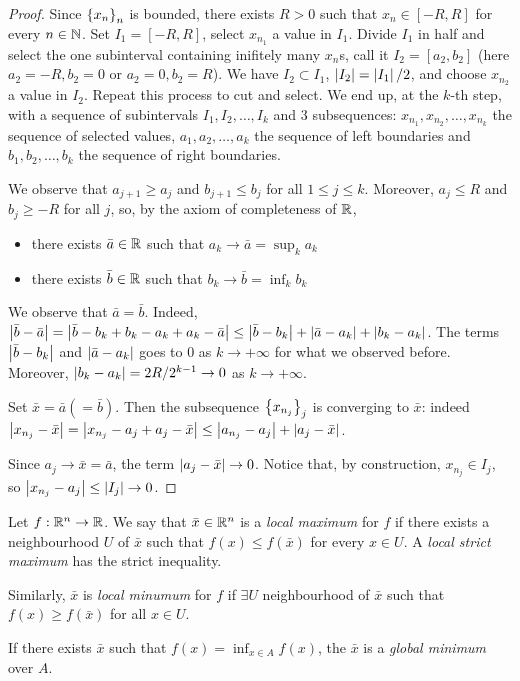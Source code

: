 \begin{proof}
    
    Since $\left\{ x_n \right\}_n$ is bounded, there exists $R > 0$ such that $x_n \in [-R,R]$ for every $n \in \mathbb{N}$. Set $I_1 = [-R,R]$, select $x_{n_1}$ a value in $I_1$. Divide $I_1$ in half and select the one subinterval containing inifitely many $x_n$s, call it $I_2 = [a_2,b_2]$ (here $a_2 = -R, b_2 = 0$ or $a_2 = 0, b_2 = R$). We have $I_2 \subset I_1$, $\left|I_2\right| = \left|I_1\right|/2$, and choose $x_{n_2}$ a value in $I_2$. Repeat this process to cut and select. We end up, at the $k$-th step, with a sequence of subintervals $I_1,I_2,\dots,I_k$ and 3 subsequences: $x_{n_1},x_{n_2}, \dots, x_{n_k}$ the sequence of selected values, $a_1,a_2,\dots,a_k$ the sequence of left boundaries and $b_1,b_2,\dots,b_k$ the sequence of right boundaries.

    We observe that $a_{j+1} \ge a_j$ and $b_{j+1} \le b_j$ for all $1 \le j \le k$. Moreover, $a_j \le R$ and $b_j \ge -R$ for all $j$, so, by the axiom of completeness of $\mathbb{R}$, 

    \begin{itemize}
        \item there exists $\bar{a} \in \mathbb{R}$ such that $a_k \to \bar{a} = \displaystyle\sup_k a_k$
        \item there exists $\bar{b} \in \mathbb{R}$ such that $b_k \to \bar{b} = \displaystyle\inf_k b_k$ 
    \end{itemize}

    We observe that $\bar{a} = \bar{b}$. Indeed, $\left|\bar{b} - \bar{a}\right| = \left|\bar{b} - b_k + b_k - a_k + a_k -\bar{a}\right| \le \left|\bar{b} - b_k\right| + \left|\bar{a} - a_k\right| + \left|b_k - a_k\right|$. The terms $\left|\bar{b} - b_k\right|$ and $\left|\bar{a} - a_k\right|$ goes to 0 as $k \to +\infty$ for what we observed before. Moreover, $\left|b_k - a_k\right| = 2R/2^{k-1} \to 0$ as $k \to +\infty$. 

    Set $\bar{x} = \bar{a} (= \bar{b})$. Then the subsequence $\left\{ x_{n_j} \right\}_j$ is converging to $\bar{x}$: indeed $ \left|x_{n_j} - \bar{x}\right| = \left|x_{n_j} - a_j + a_j - \bar{x}\right| \le \left|a_{n_j} - a_j\right| + \left|a_j - \bar{x}\right|$.

    Since $a_j \to \bar{x} = \bar{a}$, the term $\left|a_j - \bar{x}\right| \to 0$. Notice that, by construction, $x_{n_j} \in I_j$, so $\left|x_{n_j} - a_j\right| \le \left|I_j\right| \to 0$.

\end{proof}

\begin{definition}
    
    Let $f : {\mathbb{R}^n} \to \mathbb{R}$. We say that $\bar{x} \in {\mathbb{R}^n}$ is a \emph{local maximum} for $f$ if there exists a neighbourhood $U$ of $\bar{x}$ such that $f(x) \le f(\bar{x})$ for every $x \in U$. A \emph{local strict maximum} has the strict inequality.

    Similarly, $\bar{x}$ is \emph{local minumum} for $f$ if $\exists U$ neighbourhood of $\bar{x}$ such that $f(x) \ge f(\bar{x})$ for all $x \in U$.

    If there exists $\bar{x}$ such that $f(x) = \displaystyle \inf_{x \in A} f(x)$, the $\bar{x}$ is a \emph{global minimum} over $A$.

\end{definition}

